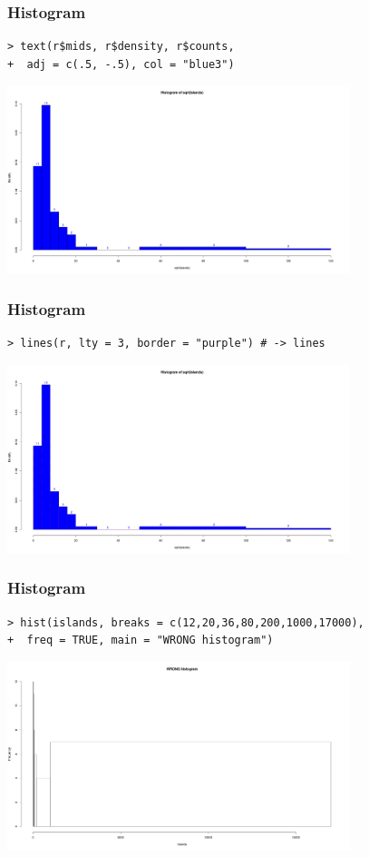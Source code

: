 \documentclass[xcolor={table},c]{beamer}
\begin{document}
\begin{frame}[fragile]\frametitle{Histogram}
\begin{center}
\begin{verbatim}
> text(r$mids, r$density, r$counts, 
+  adj = c(.5, -.5), col = "blue3")
\end{verbatim}
  \includegraphics[width=10cm]{hist5.png}
\end{center}
\end{frame}


\begin{frame}[fragile]\frametitle{Histogram}
\begin{center}
\begin{verbatim}
> lines(r, lty = 3, border = "purple") # -> lines
\end{verbatim}
  \includegraphics[width=10cm]{hist6.png}
\end{center}
\end{frame}


\begin{frame}[fragile]\frametitle{Histogram}
\begin{center}
\begin{verbatim}
> hist(islands, breaks = c(12,20,36,80,200,1000,17000), 
+  freq = TRUE, main = "WRONG histogram")
\end{verbatim}
  \includegraphics[width=10cm]{hist7.png}
\end{center}
\end{frame}
\end{document}
